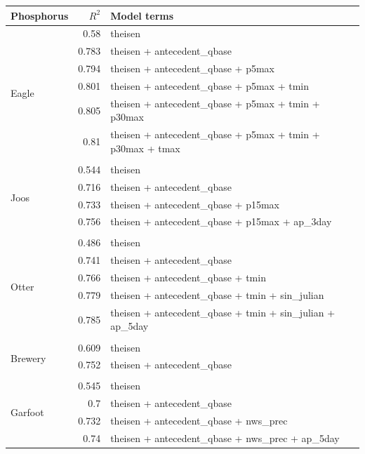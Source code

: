 \documentclass[10pt]{article}
\begin{document}
\begin{table}[h] \small
    \begin{center}
    \begin{tabular}{lrl}
    \textbf{Phosphorus} & $R^2$ & Model terms \\
    \hline
\multirow{7}{*}{Eagle} & 0.58 & theisen\\ 
 & 0.783 & theisen + antecedent\_qbase\\ 
 & 0.794 & theisen + antecedent\_qbase + p5max\\ 
 & 0.801 & theisen + antecedent\_qbase + p5max + tmin\\ 
 & 0.805 & theisen + antecedent\_qbase + p5max + tmin + p30max\\ 
 & 0.81 & theisen + antecedent\_qbase + p5max + tmin + p30max + tmax\\ 
\vspace{2mm}\\ \multirow{5}{*}{Joos} & 0.544 & theisen\\ 
 & 0.716 & theisen + antecedent\_qbase\\ 
 & 0.733 & theisen + antecedent\_qbase + p15max\\ 
 & 0.756 & theisen + antecedent\_qbase + p15max + ap\_3day\\ 
\vspace{2mm}\\ \multirow{6}{*}{Otter} & 0.486 & theisen\\ 
 & 0.741 & theisen + antecedent\_qbase\\ 
 & 0.766 & theisen + antecedent\_qbase + tmin\\ 
 & 0.779 & theisen + antecedent\_qbase + tmin + sin\_julian\\ 
 & 0.785 & theisen + antecedent\_qbase + tmin + sin\_julian + ap\_5day\\ 
\vspace{2mm}\\ \multirow{3}{*}{Brewery} & 0.609 & theisen\\ 
 & 0.752 & theisen + antecedent\_qbase\\ 
\vspace{2mm}\\ \multirow{5}{*}{Garfoot} & 0.545 & theisen\\ 
 & 0.7 & theisen + antecedent\_qbase\\ 
 & 0.732 & theisen + antecedent\_qbase + nws\_prec\\ 
 & 0.74 & theisen + antecedent\_qbase + nws\_prec + ap\_5day\\ 

\end{tabular}
\end{center}
\end{table}
\end{document}
